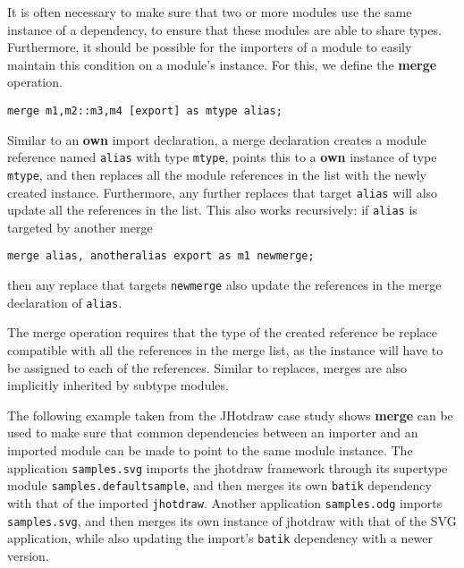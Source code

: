 


It is often necessary to make sure that two or more modules use the same
instance of a dependency, to ensure that these
modules are able to share types. Furthermore, it should be possible for
the importers of a module to easily maintain this condition on a module's
instance. For this, we define the \textbf{merge} operation.

\begin{lstlisting}
merge m1,m2::m3,m4 [export] as mtype alias;
\end{lstlisting}

Similar to an \textbf{own} import declaration, a merge declaration creates
a module reference named \texttt{alias} with type \texttt{mtype},
points this to a \textbf{own} instance of type \texttt{mtype}, and then replaces all
the module references in the list with the newly created instance. Furthermore,
any further replaces that target \texttt{alias} will also update all
the references in the list. This also works recursively: if \texttt{alias}
is targeted by another merge 
\begin{lstlisting}
merge alias, anotheralias export as m1 newmerge;
\end{lstlisting}
then any replace that targets \texttt{newmerge} also update the references
in the merge declaration of \texttt{alias}.

The merge operation requires that the type of the created reference be replace
compatible with all the references in the merge list, as the instance will
have to be assigned to each of the references. Similar to replaces, merges 
are also implicitly inherited by subtype modules.

The following example taken from the JHotdraw case study shows \textbf{merge}
can be used to make sure that common dependencies between an importer and
an imported module can be made to point to the same module instance. The
application \texttt{samples.svg} imports the jhotdraw framework through
its supertype module \texttt{samples.defaultsample}, and then merges
its own \texttt{batik} dependency with that of the imported \texttt{jhotdraw}.
Another application \texttt{samples.odg} imports \texttt{samples.svg}, 
and then merges its own instance of jhotdraw with that of the SVG application, 
while also updating the import's \texttt{batik} dependency with a newer version.

